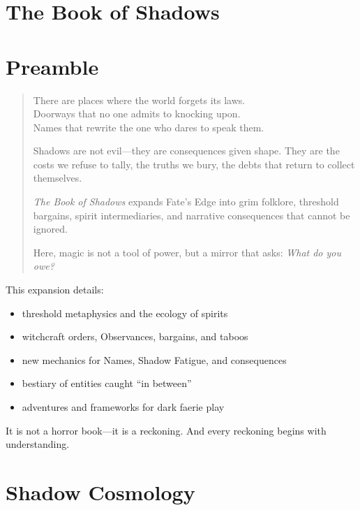 \documentclass[11pt]{book}
\begin{document}
\section{The Book of Shadows}
\label{chap:bookofshadows}

\section*{Preamble}

\begin{quote}
There are places where the world forgets its laws.\\
Doorways that no one admits to knocking upon.\\
Names that rewrite the one who dares to speak them.

Shadows are not evil---they are consequences given shape.  
They are the costs we refuse to tally, the truths we bury,  
the debts that return to collect themselves.

\emph{The Book of Shadows} expands Fate's Edge into  
grim folklore, threshold bargains, spirit intermediaries,  
and narrative consequences that cannot be ignored.  

Here, magic is not a tool of power,  
but a mirror that asks: \textit{What do you owe?}
\end{quote}

\bigskip

This expansion details:
\begin{itemize}
    \item threshold metaphysics and the ecology of spirits
    \item witchcraft orders, Observances, bargains, and taboos
    \item new mechanics for Names, Shadow Fatigue, and consequences
    \item bestiary of entities caught ``in between''
    \item adventures and frameworks for dark faerie play
\end{itemize}

It is not a horror book---it is a reckoning.  
And every reckoning begins with understanding.

\newpage

\section{Shadow Cosmology}
\label{sec:shadowcosmology}
\end{document}
